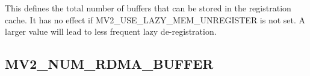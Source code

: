 This defines the total number of buffers that can be stored in the
registration cache. It has no effect if MV2\_USE\_LAZY\_MEM\_UNREGISTER is
not set. A larger value will lead to less frequent lazy
de-registration.


%
%
%


\subsection{MV2\_NUM\_RDMA\_BUFFER}
\label{def:nem-num-rdma-buffer}

